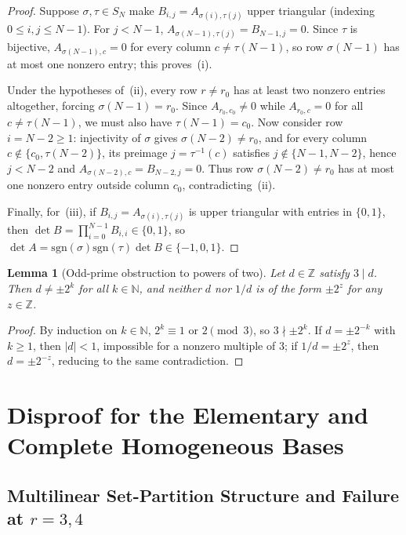 \documentclass[11pt,a4paper]{article}
\newtheorem{lemma}[theorem]{Lemma}
\theoremstyle{definition}
\theoremstyle{remark}
\newcommand{\NN}{\mathbb{N}}
\newcommand{\ZZ}{\mathbb{Z}}
\begin{document}
\begin{proof}
Suppose $\sigma, \tau \in S_N$ make $B_{i,j} = A_{\sigma(i),\tau(j)}$ upper triangular (indexing $0 \le i,j \le N-1$).
For $j < N - 1$, $A_{\sigma(N-1),\tau(j)} = B_{N-1,j} = 0$. Since $\tau$ is bijective, $A_{\sigma(N-1), c} = 0$ for every column $c \neq \tau(N-1)$, so row $\sigma(N-1)$ has at most one nonzero entry; this proves~(i).

Under the hypotheses of~(ii), every row $r \neq r_0$ has at least two nonzero entries altogether, forcing $\sigma(N-1) = r_0$. Since $A_{r_0, c_0} \neq 0$ while $A_{r_0, c} = 0$ for all $c \neq \tau(N-1)$, we must also have $\tau(N-1) = c_0$. Now consider row $i = N - 2 \ge 1$: injectivity of $\sigma$ gives $\sigma(N-2) \neq r_0$, and for every column $c \notin \{c_0, \tau(N-2)\}$, its preimage $j = \tau^{-1}(c)$ satisfies $j \notin \{N-1, N-2\}$, hence $j < N - 2$ and $A_{\sigma(N-2), c} = B_{N-2, j} = 0$. Thus row $\sigma(N-2) \neq r_0$ has at most one nonzero entry outside column $c_0$, contradicting~(ii).

Finally, for~(iii), if $B_{i,j} = A_{\sigma(i),\tau(j)}$ is upper triangular with entries in $\{0,1\}$, then $\det B = \prod_{i=0}^{N-1} B_{i,i} \in \{0,1\}$, so $\det A = \mathrm{sgn}(\sigma)\mathrm{sgn}(\tau)\det B \in \{-1,0,1\}$.
\end{proof}

\begin{lemma}[Odd-prime obstruction to powers of two]\label{lem:pow2}
Let $d \in \ZZ$ satisfy $3 \mid d$. Then $d \neq \pm 2^k$ for all $k \in \NN$, and neither $d$ nor $1/d$ is of the form $\pm 2^z$ for any $z \in \ZZ$.
\end{lemma}

\begin{proof}
By induction on $k \in \NN$, $2^k \equiv 1$ or $2 \pmod{3}$, so $3 \nmid \pm 2^k$. If $d = \pm 2^{-k}$ with $k \ge 1$, then $|d| < 1$, impossible for a nonzero multiple of $3$; if $1/d = \pm 2^z$, then $d = \pm 2^{-z}$, reducing to the same contradiction.
\end{proof}

\section{Disproof for the Elementary and Complete Homogeneous Bases}

\subsection{Multilinear Set-Partition Structure and Failure at \texorpdfstring{$r = 3, 4$}{r = 3, 4}}
\end{document}
